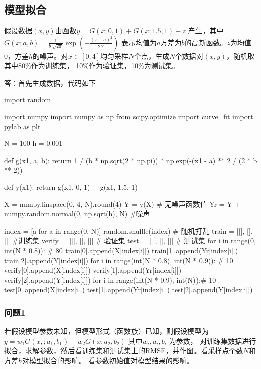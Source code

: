 \chapter{}
\section{模型拟合}

假设数据$(x,y)$由函数$y=G(x;0,1) + G(x; 1.5, 1) + z$ 产生，其中$G(x; a,b) = \frac{1}{b\sqrt[]{2\pi}} \exp (-\frac{(x-a)^2}{2b^2})$
表示均值为$a$方差为$b$的高斯函数。$z$为均值0，方差$h$的噪声。对$x \in [0,4]$均匀采样$N$个点，生成$N$个数据对$(x,y)$，随机取其中80\%作为训练集， 10\%作为验证集，10\%为测试集。

答：首先生成数据，代码如下

\begin{python}
import random

import numpy
import numpy as np
from scipy.optimize import curve_fit
import pylab as plt

N = 100
h = 0.001


def g(x1, a, b):
    return 1 / (b * np.sqrt(2 * np.pi)) * np.exp(-(x1 - a) ** 2 / (2 * b ** 2))


def y(x1):
    return g(x1, 0, 1) + g(x1, 1.5, 1)

X = numpy.linspace(0, 4, N).round(4)
Y = y(X) # 无噪声函数值
Yr = Y + numpy.random.normal(0, np.sqrt(h), N) #噪声

index = [a for a in range(0, N)] 
random.shuffle(index) # 随机打乱
train = [[], [], []] #训练集
verify = [[], [], []] # 验证集
test = [[], [], []] # 测试集
for i in range(0, int(N * 0.8)): # 80%
    train[0].append(X[index[i]])
    train[1].append(Yr[index[i]])
    train[2].append(Y[index[i]])
for i in range(int(N * 0.8), int(N * 0.9)): # 10%
    verify[0].append(X[index[i]])
    verify[1].append(Yr[index[i]])
    verify[2].append(Y[index[i]])
for i in range(int(N * 0.9), int(N)):# 10%
    test[0].append(X[index[i]])
    test[1].append(Yr[index[i]])
    test[2].append(Y[index[i]])

\end{python}

\subsection{问题1}

 若假设模型参数未知，但模型形式（函数族）已知，则假设模型为$y = w_1G(x,; a_1, b_1) + w_2G(x;a_2,b_2)$ 其中$w_i,a_i,b_i$ 为参数，
 对训练集数据进行拟合，求解参数，然后看训练集和测试集上的RMSE，并作图。看采样点个数$N$和方差$h$对模型拟合的影响。
 看参数初始值对模型结果的影响。

